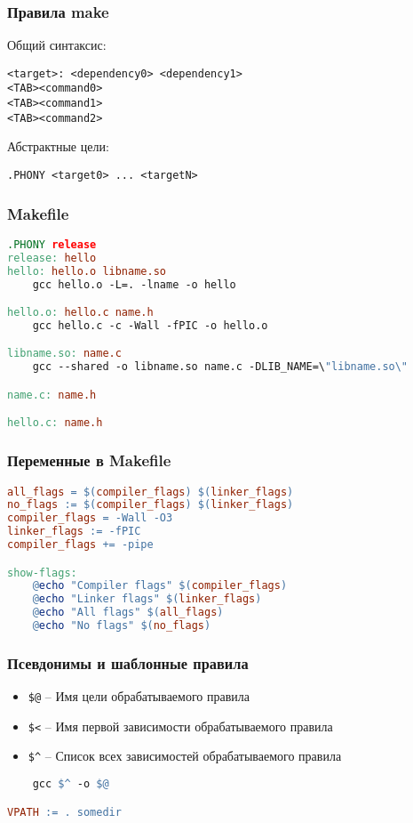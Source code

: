 \begin{frame}[fragile]
	\frametitle{Правила make}

	Общий синтаксис:
	\begin{verbatim}
<target>: <dependency0> <dependency1>
<TAB><command0>
<TAB><command1>
<TAB><command2>
	\end{verbatim}

	Абстрактные цели:
	\begin{verbatim}
.PHONY <target0> ... <targetN>
	\end{verbatim}
\end{frame}

\begin{frame}[fragile]
	\frametitle{Makefile}

	\begin{lstlisting}[language=make]
.PHONY release
release: hello
hello: hello.o libname.so
    gcc hello.o -L=. -lname -o hello

hello.o: hello.c name.h
    gcc hello.c -c -Wall -fPIC -o hello.o

libname.so: name.c
    gcc --shared -o libname.so name.c -DLIB_NAME=\"libname.so\"

name.c: name.h

hello.c: name.h
	\end{lstlisting}
\end{frame}



\begin{frame}[fragile]
	\frametitle{Переменные в Makefile}
	\begin{lstlisting}[language=make]
all_flags = $(compiler_flags) $(linker_flags)
no_flags := $(compiler_flags) $(linker_flags)
compiler_flags = -Wall -O3
linker_flags := -fPIC
compiler_flags += -pipe

show-flags:
    @echo "Compiler flags" $(compiler_flags)
    @echo "Linker flags" $(linker_flags)
    @echo "All flags" $(all_flags)
    @echo "No flags" $(no_flags)
	\end{lstlisting}
\end{frame}
\begin{frame}[fragile]
	\frametitle{Псевдонимы и шаблонные правила}

	\begin{itemize}
		\item {\tt \$@} -- Имя цели обрабатываемого правила
		\item {\tt \$<} -- Имя первой зависимости обрабатываемого правила 
		\item {\tt \$\^{}} -- Список всех зависимостей обрабатываемого правила
	\end{itemize}

	\begin{lstlisting}[language=make]
%.o: %.c
    gcc $^ -o $@

VPATH := . somedir
	\end{lstlisting}
\end{frame}

